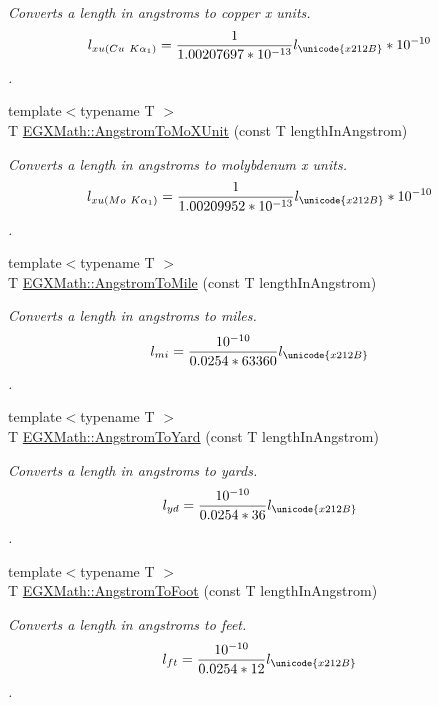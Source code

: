 \begin{DoxyCompactItemize}
\begin{DoxyCompactList}\small\item\em Converts a length in angstroms to copper x units. \[ l_{xu(Cu\ K\alpha_1)}= \frac{1}{1.00207697*10^{-13}} l_{\unicode{x212B}} * 10^{-10}\]. \end{DoxyCompactList}\item 
{\footnotesize template$<$typename T $>$ }\\T \mbox{\hyperlink{group___e_g_x_math-_conversions-_length_conversions-_non-_s_i-_angstrom-_non-_s_i_ga197c8294d73fcc3171cd05fc595816c4}{E\+G\+X\+Math\+::\+Angstrom\+To\+Mo\+X\+Unit}} (const T length\+In\+Angstrom)
\begin{DoxyCompactList}\small\item\em Converts a length in angstroms to molybdenum x units. \[ l_{xu(Mo\ K\alpha_1)}=\frac{1}{1.00209952*10^{-13}} l_{\unicode{x212B}} * 10^{-10}\]. \end{DoxyCompactList}\item 
{\footnotesize template$<$typename T $>$ }\\T \mbox{\hyperlink{group___e_g_x_math-_conversions-_length_conversions-_non-_s_i-_angstrom-_imperial_ga184d0b1ccefcc2e210a8a42530573bac}{E\+G\+X\+Math\+::\+Angstrom\+To\+Mile}} (const T length\+In\+Angstrom)
\begin{DoxyCompactList}\small\item\em Converts a length in angstroms to miles. \[ l_{mi}=\frac{10^{-10}}{0.0254 * 63360} l_{\unicode{x212B}} \]. \end{DoxyCompactList}\item 
{\footnotesize template$<$typename T $>$ }\\T \mbox{\hyperlink{group___e_g_x_math-_conversions-_length_conversions-_non-_s_i-_angstrom-_imperial_ga57cb8a4219a83a504bf2ea1e7d250144}{E\+G\+X\+Math\+::\+Angstrom\+To\+Yard}} (const T length\+In\+Angstrom)
\begin{DoxyCompactList}\small\item\em Converts a length in angstroms to yards. \[ l_{yd}= \frac{10^{-10}}{0.0254 * 36} l_{\unicode{x212B}} \]. \end{DoxyCompactList}\item 
{\footnotesize template$<$typename T $>$ }\\T \mbox{\hyperlink{group___e_g_x_math-_conversions-_length_conversions-_non-_s_i-_angstrom-_imperial_ga54cf539cd2acf7065ed22fb4a846d933}{E\+G\+X\+Math\+::\+Angstrom\+To\+Foot}} (const T length\+In\+Angstrom)
\begin{DoxyCompactList}\small\item\em Converts a length in angstroms to feet. \[ l_{ft}= \frac{10^{-10}}{0.0254 * 12} l_{\unicode{x212B}} \]. \end{DoxyCompactList}\item 

\end{DoxyCompactItemize}
